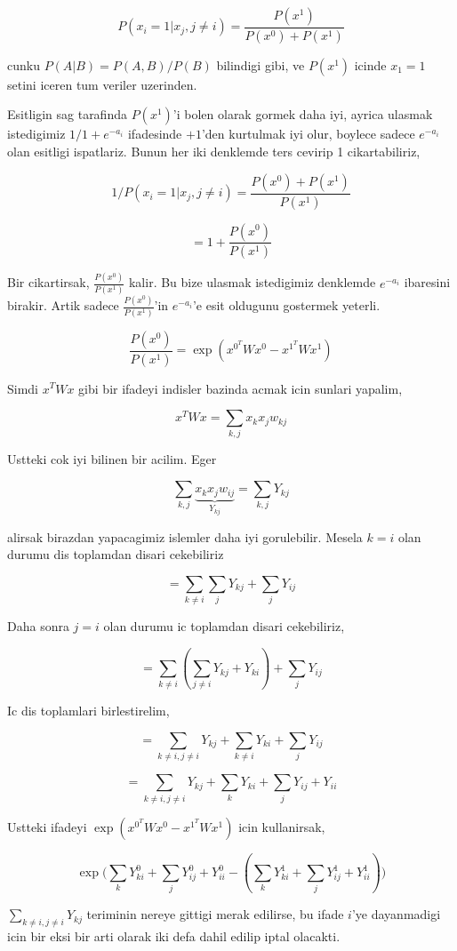 \documentclass[12pt,fleqn]{article}\usepackage{../common}
\begin{document}
$$  P(x_i = 1 | x_j,j \ne i)  = \frac{P(x^1)}{P(x^0) + P(x^1)} $$

cunku $P(A|B) = P(A,B) / P(B)$ bilindigi gibi, ve $P(x^1)$ icinde $x_1=1$
setini iceren tum veriler uzerinden. 

Esitligin sag tarafinda $P(x^1)$'i bolen olarak gormek daha iyi, ayrica
ulasmak istedigimiz $1/1 + e^{-a_i}$ ifadesinde $+1$'den kurtulmak iyi
olur, boylece sadece $e^{-a_i}$ olan esitligi ispatlariz. Bunun her iki
denklemde ters cevirip 1 cikartabiliriz,

$$  1 / P(x_i = 1 | x_j,j \ne i) = \frac{P(x^0) + P(x^1)}{P(x^1)} 
$$

$$= 
1 + \frac{ P(x^0)}{P(x^1)}
$$

Bir cikartirsak, $\frac{ P(x^0)}{P(x^1)}$ kalir. Bu bize ulasmak
istedigimiz denklemde $e^{-a_i}$ ibaresini birakir. Artik sadece $\frac{
  P(x^0)}{P(x^1)}$'in $e^{-a_i}$'e esit oldugunu gostermek 
yeterli. 


$$ 
\frac{ P(x^0)}{P(x^1)} = \exp( x^{0^T}Wx^0 -   x^{1^T}Wx^1 )
$$

Simdi $x^TWx$ gibi bir ifadeyi indisler bazinda acmak icin sunlari yapalim, 


$$ x^TWx = \sum_{k,j} x_kx_jw_{kj} $$

Ustteki cok iyi bilinen bir acilim. Eger

$$  \sum_{k,j} \underbrace{x_kx_jw_{ij}}_{Y_{kj}} = \sum_{k,j}Y_{kj} $$

alirsak birazdan yapacagimiz islemler daha iyi gorulebilir. Mesela $k=i$
olan durumu dis toplamdan disari cekebiliriz

$$ 
= \sum_{k \ne i}\sum_j Y_{kj} + \sum_{j} Y_{ij}
$$

Daha sonra $j = i$ olan durumu ic toplamdan disari cekebiliriz, 


$$ 
= \sum_{k \ne i}( \sum_{j \ne i} Y_{kj} + Y_{ki}) + \sum_{j} Y_{ij}
$$

Ic dis toplamlari birlestirelim,


$$ 
= \sum_{k \ne i,j \ne i} Y_{kj} + \sum_{k \ne i}  Y_{ki} + \sum_{j} Y_{ij}
$$

$$ 
= \sum_{k \ne i,j \ne i} Y_{kj} + \sum_{k}  Y_{ki} + \sum_{j} Y_{ij} + Y_{ii}
$$

Ustteki ifadeyi $ \exp( x^{0^T}Wx^0 -   x^{1^T}Wx^1 )$ icin kullanirsak,

$$ 
\exp 
\big( 
\sum_{k}  Y_{ki}^0 + \sum_{j} Y_{ij}^0 + Y_{ii}^0 - 
( \sum_{k}  Y_{ki}^1 + \sum_{j} Y_{ij}^1 + Y_{ii}^1  )
\big)
 $$

$\sum_{k \ne i,j \ne i} Y_{kj}$ teriminin nereye gittigi merak edilirse,
bu ifade $i$'ye dayanmadigi icin bir eksi bir arti olarak iki defa dahil
edilip iptal olacakti. 
\end{document}
